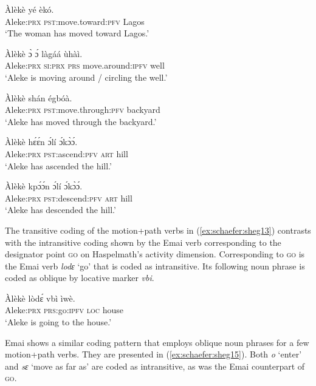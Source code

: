 \documentclass[output=paper,colorlinks,citecolor=brown
]{langscibook}
\begin{document}
 \ea \label{ex:schaefer:sheg13}
\begin{xlist}
\ex \label{ex:schaefer:sheg13a}
    \gll Àlèkè yé èkó. \\
        {Aleke:\textsc{prx}} {\textsc{pst}:move.toward:\textsc{pfv}} Lagos \\
           \glt ‘The woman has moved toward Lagos.’

\ex \label{ex:schaefer:sheg13b}
    \gll Àlèkè ɔ̀ ɔ́ làgáá ùhàì. \\
        {Aleke:\textsc{prx}} {\textsc{si:prx}} \textsc{prs} {move.around:\textsc{ipfv}} well \\
           \glt ‘Aleke is moving around / circling the well.’

\ex \label{ex:schaefer:sheg13c}
    \gll Àlèkè shán égbóà. \\
        {Aleke:\textsc{prx}} {\textsc{pst}:move.through:\textsc{pfv}} backyard \\
           \glt ‘Aleke has moved through the backyard.’

\ex \label{ex:schaefer:sheg13d}
    \gll Àlèkè hɛ́ɛ́n ɔ́lí ɔ́kɔ̀ɔ́. \\
        {Aleke:\textsc{prx}} {\textsc{pst}:ascend:\textsc{pfv}} \textsc{art} hill \\
           \glt ‘Aleke has ascended the hill.’

\ex \label{ex:schaefer:sheg13e}
    \gll Àlèkè kpɔ́ɔ́n ɔ́lí ɔ́kɔ̀ɔ́. \\
        {Aleke:\textsc{prx}} {\textsc{pst}:descend:\textsc{pfv}} \textsc{art} hill \\
           \glt ‘Aleke has descended the hill.’

\end{xlist}
\z	

The transitive coding of the motion+path verbs in (\ref{ex:schaefer:sheg13}) contrasts with the intransitive coding shown by the Emai verb corresponding to the designator point \textsc{go} on Haspelmath’s activity dimension. Corresponding to \textsc{go} is the Emai verb \textit{lodɛ} ‘go’ that is coded as intransitive. Its following noun phrase is coded as oblique by locative marker \textit{vbi}.  

\ea \label{ex:schaefer:sheg14}
    \gll Àlèkè lòdɛ́ vbì ìwè. \\
        Aleke:\textsc{prx} \textsc{prs}:go:\textsc{ipfv} \textsc{loc} house\\
           \glt ‘Aleke is going to the house.’
\z	

Emai shows a similar coding pattern that employs oblique noun phrases for a few motion+path verbs. They are presented in (\ref{ex:schaefer:sheg15}). Both \textit{o} ‘enter’ and \textit{sɛ} ‘move as far as’ are coded as intransitive, as was the Emai counterpart of \textsc{go}.  
\end{document}
